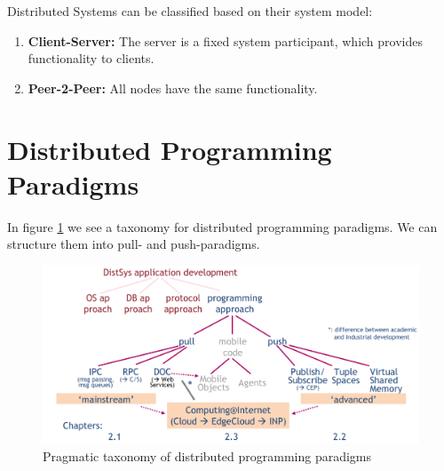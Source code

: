 Distributed Systems can be classified based on their system model:

\begin{enumerate}
    \item \textbf{Client-Server:} The server is a fixed system participant, which provides functionality to clients.
    \item \textbf{Peer-2-Peer:} All nodes have the same functionality.
\end{enumerate}

\section{Distributed Programming Paradigms}

In figure \ref{fig:programming_paradigms} we see a taxonomy for distributed programming paradigms. We can structure them into pull- and push-paradigms.

\begin{figure}[h]
    \centering
    \includegraphics[width=\textwidth]{gfx/programming_paradigms.png}
    \caption{Pragmatic taxonomy of distributed programming paradigms}
    \label{fig:programming_paradigms}
\end{figure}

